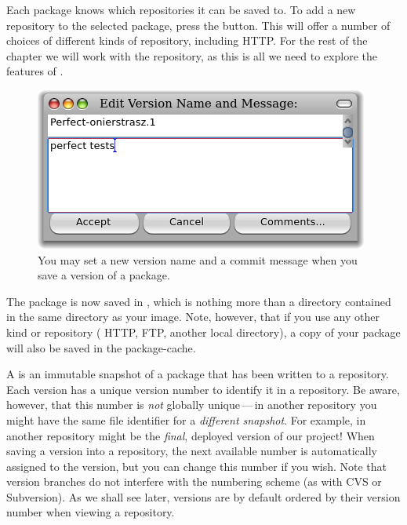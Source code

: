 \documentclass[a4paper,10pt,twoside]{book}
\begin{document}
Each package knows which repositories it can be saved to.
To add a new repository to the selected package, press the  button. This will offer a number of choices of different kinds of repository, including HTTP. For the rest of the chapter we will work with the  repository, as this is all we need to explore the features of \MC.


\begin{figure}[ht]\centering
	\includegraphics[width=.6\textwidth]{saving}
	\caption{You may set a new version name and a commit message when you save a version of a package.}
\end{figure}

The  package is now saved in , which is nothing more than a directory contained in the same directory as your \pharo image. Note, however, that if you use any other kind or repository (\eg{} HTTP, FTP, another local directory), a copy of your package will also be saved in the package-cache. 



A  is an immutable snapshot of a package that has been written to a repository. Each version has a unique version number to identify it in a repository.
Be aware, however, that this number is \emph{not} globally unique\,---\,in another repository you might have the same file identifier for a \emph{different snapshot}. For example,  in another repository might be the \emph{final}, deployed version of our project!
When saving a version into a repository, the next available number is automatically assigned to the version, but you can change this number if you wish.
Note that version branches do not interfere with the numbering scheme (as with CVS or Subversion). As we shall see later, versions are by default ordered by their version number when viewing a repository.
\end{document}
